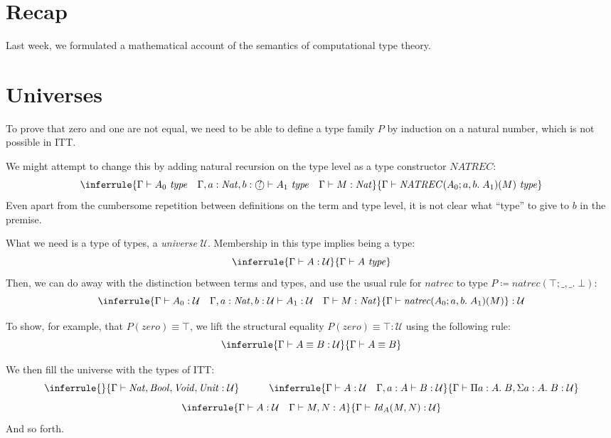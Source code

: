 \documentclass{article} \usepackage{chtt-notes} \usepackage{stmaryrd}
\newcommand{\entails}{\vdash}
\newcommand{\G}{\Gamma}
\newcommand{\atype}[1]{#1~\mathit{type}}
\newcommand{\Nat}{\mathit{Nat}}
\newcommand{\circled}[1]{\text{\textcircled{#1}}}
\begin{document}
\maketitle
\section{Recap}

Last week, we formulated a mathematical account of the semantics of computational
type theory.

% 

\section{Universes}%
%
To prove that zero and one are not equal, we need to be able to define a type family $P$ by induction on a natural number, which is not possible in ITT.

We might attempt to change this by adding natural recursion on the type level as a type constructor $\mathit{NATREC}$:
\[ \inferrule{\G \entails \atype{A_0} \quad \G, a: \Nat, b: \circled{?} \entails \atype{A_1} \quad \G \entails M : \Nat}{\G \entails \atype{\mathit{NATREC}(A_0; a,b.\; A_1)(M)}} \]
Even apart from the cumbersome repetition between definitions on the term and type level, it is not clear what ``type'' to give to $b$ in the premise.

What we need is a type of types, a \emph{universe} $\mathcal{U}$.
Membership in this type implies being a type:
\[ \inferrule{\G \entails A : \mathcal{U}}{\G \entails \atype{A}} \]
Then, we can do away with the distinction between terms and types, and use the usual rule for $\mathit{natrec}$ to type $P \coloneqq \mathit{natrec}(\top; \_, \_. \; \bot)$:
\[ \inferrule{\G \entails A_0 : \mathcal{U} \quad \G, a : \Nat, b : \mathcal{U} \entails A_1 : \mathcal{U} \quad \G \entails M : \Nat}{\G \entails \mathit{natrec}(A_0; a, b.\; A_1)(M)} : \mathcal{U} \]

To show, for example, that $P(\mathit{zero}) \equiv \top$, we lift the structural equality $P(\mathit{zero}) \equiv \top : \mathcal{U}$ using the following rule:
\[ \inferrule{\G \entails A \equiv B : \mathcal{U}}{\G \entails A \equiv B} \]

We then fill the universe with the types of ITT:
\[ \inferrule{}{\G \entails \Nat, \mathit{Bool}, \mathit{Void}, \mathit{Unit} : \mathcal{U}} \quad \quad \quad \inferrule{\G \entails A : \mathcal{U} \quad \G, a: A \entails B : \mathcal{U}}{\G \entails \Pi a : A.\; B, \Sigma a : A.\; B : \mathcal{U}}\]
\[ \inferrule{\G \entails A : \mathcal{U} \quad \G \entails M, N : A}{\G \entails \mathit{Id}_A(M, N) : \mathcal{U}} \]
And so forth.
\end{document}
